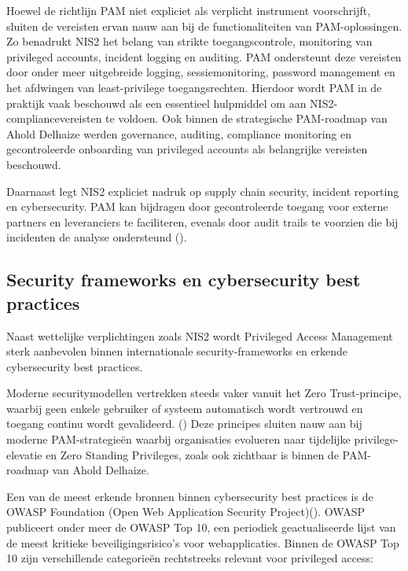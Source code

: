 Hoewel de richtlijn PAM niet expliciet als verplicht instrument voorschrijft, sluiten de vereisten ervan nauw aan bij de functionaliteiten van PAM-oplossingen. Zo benadrukt NIS2 het belang van strikte toegangscontrole, monitoring van privileged accounts, incident logging en auditing. PAM ondersteunt deze vereisten door onder meer uitgebreide logging, sessiemonitoring, password management en het afdwingen van least-privilege toegangsrechten. Hierdoor wordt PAM in de praktijk vaak beschouwd als een essentieel hulpmiddel om aan NIS2-compliancevereisten te voldoen. Ook binnen de strategische PAM-roadmap van Ahold Delhaize werden governance, auditing, compliance monitoring en gecontroleerde onboarding van privileged accounts als belangrijke vereisten beschouwd.

Daarnaast legt NIS2 expliciet nadruk op supply chain security, incident reporting en cybersecurity. PAM kan bijdragen door gecontroleerde toegang voor externe partners en leveranciers te faciliteren, evenals door audit trails te voorzien die bij incidenten de analyse ondersteund (\cite{hsu2021pam}). 

\subsection{Security frameworks en cybersecurity best practices}
\label{security-frameworks-en-cybersecurity-best-practices}

Naast wettelijke verplichtingen zoals NIS2 wordt Privileged Access Management sterk aanbevolen binnen internationale security-frameworks en erkende cybersecurity best practices. 

Moderne securitymodellen vertrekken steeds vaker vanuit het Zero Trust-principe, waarbij geen enkele gebruiker of systeem automatisch wordt vertrouwd en toegang continu wordt gevalideerd. (\cite{nist_zta_800_207}) Deze principes sluiten nauw aan bij moderne PAM-strategieën waarbij organisaties evolueren naar tijdelijke privilege-elevatie en Zero Standing Privileges, zoals ook zichtbaar is binnen de PAM-roadmap van Ahold Delhaize.

Een van de meest erkende bronnen binnen cybersecurity best practices is de OWASP Foundation (Open Web Application Security Project)(\cite{OWASPTop10_2021}). OWASP publiceert onder meer de OWASP Top 10, een periodiek geactualiseerde lijst van de meest kritieke beveiligingsrisico’s voor webapplicaties.
Binnen de OWASP Top 10 zijn verschillende categorieën rechtstreeks relevant voor privileged access:


